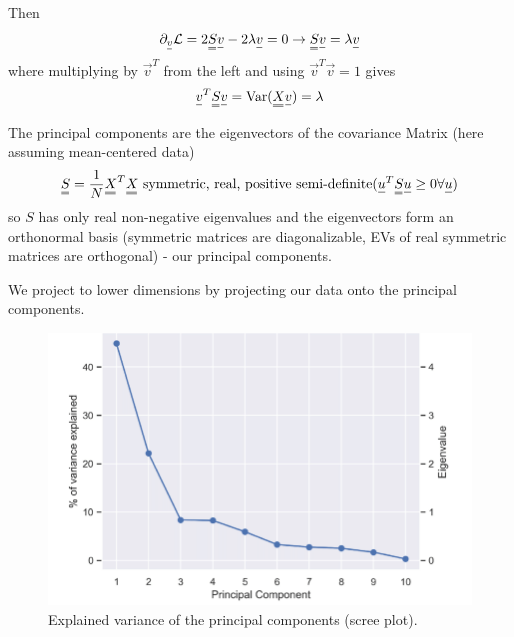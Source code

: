 Then
\begin{equation}
    \partial_{\vec{v}} \mathcal{L} = 2 \mat{S} \vec{v} - 2 \lambda \vec{v} = 0 \rightarrow \mat{S} \vec{v} = \lambda \vec{v}
\end{equation}
where multiplying by $\vec{v}^T$ from the left and using $\vec{v}^T \vec{v} = 1$ gives
\begin{equation}
    \vec{v}^T \mat{S} \vec{v} = \Var(\mat{X}\vec{v}) = \lambda
\end{equation}



The principal components are the eigenvectors of the covariance Matrix
(here assuming mean-centered data)
\begin{equation}
    \mat{S} = \frac{1}{N} \mat{X}^T \mat{X} \text{ symmetric, real, positive semi-definite} (\vec{u}^T \mat{S} \vec{u} \geq 0 \forall \vec{u})
\end{equation}
so $S$ has only real non-negative eigenvalues and the eigenvectors form an orthonormal basis
(symmetric matrices are diagonalizable, EVs of real symmetric matrices are orthogonal) - our principal
components.


We project to lower dimensions by projecting our data onto the principal components.


\begin{figure}
    \centering
    \includegraphics[width=.75\textwidth]{figures/var_exp.png}
    \caption{Explained variance of the principal components (scree plot).}
    \label{fig:explained_variance}
\end{figure}

